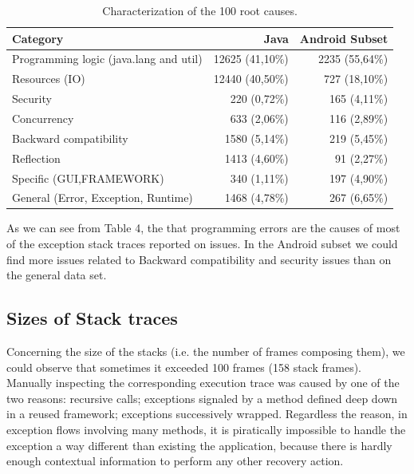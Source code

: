 \documentclass[conference]{IEEEtran}
\begin{document}
\begin{table}
  \centering
  \begin{tabular}{lrr}
    \hline
    \bfseries{Category} & \bfseries{Java} & \bfseries{Android Subset} \\
    \hline
      Programming logic (java.lang and util) & 12625	(41,10\%)	& 2235 (55,64\%)\\
      Resources (IO) & 12440 (40,50\%) & 727 (18,10\%) \\ 
      Security & 220	(0,72\%) & 165 (4,11\%)\\
      Concurrency	& 633 (2,06\%) & 116	(2,89\%)\\
      Backward compatibility & 1580 (5,14\%) & 219 (5,45\%) \\
      Reflection &1413 (4,60\%)   & 91 (2,27\%)\\
      Specific (GUI,FRAMEWORK) &	340	(1,11\%) & 197 (4,90\%)\\
      General (Error, Exception, Runtime) & 1468 (4,78\%) & 267 (6,65\%)\\
    \hline
  \end{tabular}
  \caption{Characterization of the 100 root causes.}
  \label{tab:tophundrend}
\end{table}

As we can see from Table 4, the that programming errors are the causes of most of the exception stack traces reported on issues. In the Android subset we could find more issues related to Backward compatibility and security issues than on the general data set.

\subsection{Sizes of Stack traces}

Concerning the size of the stacks (i.e. the number of frames composing them), we could observe that  sometimes it exceeded 100 frames (158 stack frames). Manually inspecting the corresponding execution trace was caused by one of the two reasons: recursive calls; exceptions signaled by a method defined deep down in a reused framework; exceptions successively wrapped. Regardless the reason, in exception flows involving many methods, it is piratically impossible to handle the exception a way different than existing the  application, because there is hardly enough contextual information to perform any other recovery action.



\end{document}
